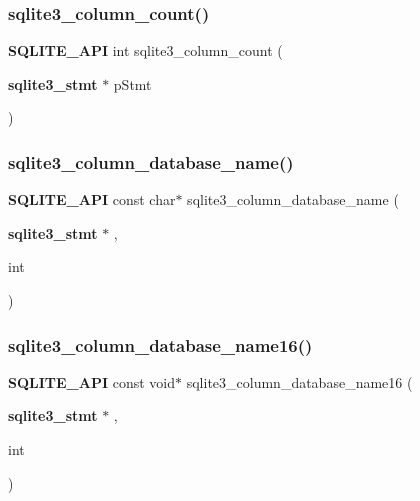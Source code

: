 \subsubsection{sqlite3\_column\_count()}
{\footnotesize\ttfamily \textbf{ S\+Q\+L\+I\+T\+E\+\_\+\+A\+PI} int sqlite3\+\_\+column\+\_\+count (\begin{DoxyParamCaption}\item[{\textbf{ sqlite3\+\_\+stmt} $\ast$}]{p\+Stmt }\end{DoxyParamCaption})}

\mbox{\label{sqlite3_8h_aff51c9463875fb8daba7259aedfda7c9}} 
\subsubsection{sqlite3\_column\_database\_name()}
{\footnotesize\ttfamily \textbf{ S\+Q\+L\+I\+T\+E\+\_\+\+A\+PI} const char$\ast$ sqlite3\+\_\+column\+\_\+database\+\_\+name (\begin{DoxyParamCaption}\item[{\textbf{ sqlite3\+\_\+stmt} $\ast$}]{,  }\item[{int}]{ }\end{DoxyParamCaption})}

\mbox{\label{sqlite3_8h_ab3487e26fedd9c8bf745d580e293fc3b}} 
\subsubsection{sqlite3\_column\_database\_name16()}
{\footnotesize\ttfamily \textbf{ S\+Q\+L\+I\+T\+E\+\_\+\+A\+PI} const void$\ast$ sqlite3\+\_\+column\+\_\+database\+\_\+name16 (\begin{DoxyParamCaption}\item[{\textbf{ sqlite3\+\_\+stmt} $\ast$}]{,  }\item[{int}]{ }\end{DoxyParamCaption})}

\mbox{\label{sqlite3_8h_a3cdf5e63589b1235030b6ad95f03d83b}} 
